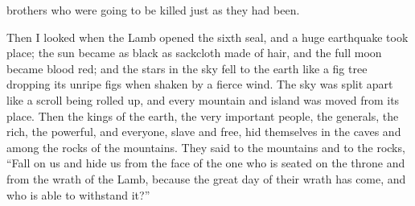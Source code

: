 {brothers
who were going
to be killed
just as they had been.
\par }{\PP {}Then
I looked
when
the Lamb opened
the sixth
seal,
and
a huge
earthquake
took place;
the sun
became
as black
as
sackcloth
made of hair,
and
the full
moon
became
blood red;
and
the stars
in the sky
fell
to
the earth
like
a fig tree
dropping
its
unripe figs
when shaken
by
a fierce
wind.
The sky
was split apart
like
a scroll
being rolled up,
and
every
mountain
and
island
was moved
from
its
place.
Then
the kings
of the earth,
the very important people,
the generals,
the rich,
the powerful,
and
everyone,
slave
and
free,
hid
themselves
in
the caves
and
among
the rocks
of the mountains.
They said
to the mountains
and
to the rocks,
“Fall
on
us
and
hide
us
from
the face
of the one who is seated
on
the throne
and
from
the wrath
of the Lamb,
because
the great
day
of their
wrath
has come,
and
who
is able
to withstand it?”

}
